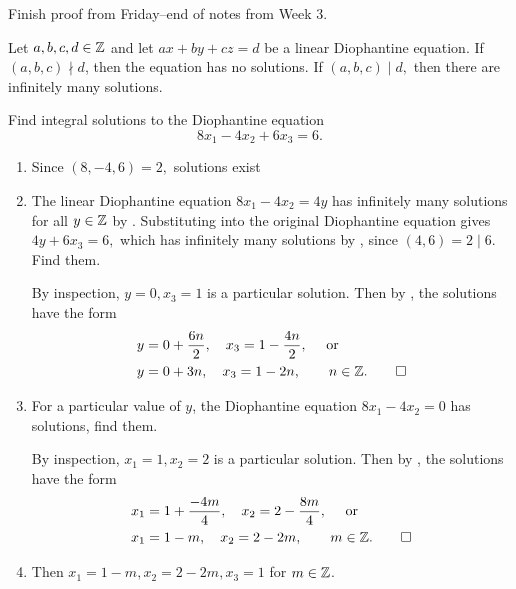 \documentclass[letterpaper, 11 pt]{ximera}
\begin{document}
Finish proof from Friday--end of notes from Week 3.


\begin{proposition}\label{prop:3diophantine}
    Let $a,b,c,d\in\mathbb Z$ and let $ax+by+cz=d$ be a linear Diophantine equation. If $(a,b,c)\nmid d$, then the equation has no solutions. If $(a,b,c)\mid d,$ then there are infinitely many solutions.
\end{proposition}

\begin{br}
Find integral solutions to the Diophantine equation \[8x_1-4x_2+6x_3=6.\]

\begin{enumerate}
    \item Since $(8,-4,6)=2,$ solutions exist
    \item The linear Diophantine equation $8x_1-4x_2=4y$ has infinitely many solutions for all $y\in\mathbb Z$ by . Substituting into the original Diophantine equation gives $4y+6x_3=6,$ which has infinitely many solutions by , since $(4,6)=2\mid 6$. Find them.
     
    \begin{solution}
        By inspection, $y=0,x_3=1$ is a particular solution. Then by , the solutions have the form 
        \begin{align*}
            y&=0+\frac{6n}{2},\quad x_3=1-\frac{4n}{2}, \quad \textnormal{ or }\\
            y&=0+3n,\quad x_3=1-2n, \qquad n\in\mathbb Z. \qedhere
        \end{align*}
        \end{solution}
    \item  For a particular value of $y$, the Diophantine equation $8x_1-4x_2=0$ has solutions, find them. 
    \begin{solution}
        By inspection, $x_1=1,x_2=2$ is a particular solution. Then by , the solutions have the form 
        \begin{align*}
            x_1&=1+\frac{-4m}{4},\quad x_2=2-\frac{8m}{4}, \quad \textnormal{ or }\\
            x_1&=1-m,\quad x_2=2-2m, \qquad m\in\mathbb Z. \qedhere
        \end{align*}
        \end{solution}
    \item Then $x_1=1-m, x_2=2-2m,x_3=1$ for $m\in\mathbb Z$.
\end{enumerate}
\end{br}
\end{document}
